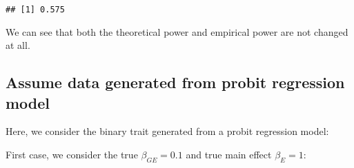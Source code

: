 \documentclass[
]{article}
\newenvironment{Shaded}{\begin{snugshade}}{\end{snugshade}}
\newcommand{\AttributeTok}[1]{\textcolor[rgb]{0.77,0.63,0.00}{#1}}
\newcommand{\ControlFlowTok}[1]{\textcolor[rgb]{0.13,0.29,0.53}{\textbf{#1}}}
\newcommand{\DecValTok}[1]{\textcolor[rgb]{0.00,0.00,0.81}{#1}}
\newcommand{\DocumentationTok}[1]{\textcolor[rgb]{0.56,0.35,0.01}{\textbf{\textit{#1}}}}
\newcommand{\FunctionTok}[1]{\textcolor[rgb]{0.00,0.00,0.00}{#1}}
\newcommand{\NormalTok}[1]{#1}
\newcommand{\OtherTok}[1]{\textcolor[rgb]{0.56,0.35,0.01}{#1}}
\newcommand{\SpecialCharTok}[1]{\textcolor[rgb]{0.00,0.00,0.00}{#1}}
\newcommand{\StringTok}[1]{\textcolor[rgb]{0.31,0.60,0.02}{#1}}
\begin{document}
\begin{Shaded}
\end{Shaded}

\begin{verbatim}
## [1] 0.575
\end{verbatim}

We can see that both the theoretical power and empirical power are not
changed at all.

\hypertarget{assume-data-generated-from-probit-regression-model}{%
\subsection{Assume data generated from probit regression
model}\label{assume-data-generated-from-probit-regression-model}}

Here, we consider the binary trait generated from a probit regression
model:

First case, we consider the true \(\beta_{GE} = 0.1\) and true main
effect \(\beta_E=1\):
\end{document}
